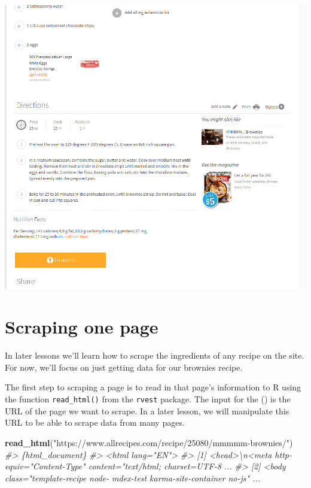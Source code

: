 \documentclass[
  12pt,
]{book}
\newenvironment{Shaded}{\begin{snugshade}}{\end{snugshade}}
\newcommand{\CommentTok}[1]{\textcolor[rgb]{0.37,0.37,0.37}{\textit{#1}}}
\newcommand{\KeywordTok}[1]{\textcolor[rgb]{0.27,0.27,0.27}{\textbf{#1}}}
\newcommand{\NormalTok}[1]{#1}
\newcommand{\StringTok}[1]{\textcolor[rgb]{0.5,0.5,0.5}{#1}}
\begin{document}
\includegraphics{images/brownies_2.PNG}

\hypertarget{scraping-one-page}{%
\section{Scraping one page}\label{scraping-one-page}}

In later lessons we'll learn how to scrape the ingredients of any recipe on the site. For now, we'll focus on just getting data for our brownies recipe.

The first step to scraping a page is to read in that page's information to R using the function \texttt{read\_html()} from the \texttt{rvest} package. The input for the () is the URL of the page we want to scrape. In a later lesson, we will manipulate this URL to be able to scrape data from many pages.

\begin{Shaded}
\begin{Highlighting}[]
\KeywordTok{read\_html}\NormalTok{(}\StringTok{"https://www.allrecipes.com/recipe/25080/mmmmm{-}brownies/"}\NormalTok{)}
\CommentTok{\#\textgreater{} \{html\_document\}}
\CommentTok{\#\textgreater{} \textless{}html lang="EN"\textgreater{}}
\CommentTok{\#\textgreater{} [1] \textless{}head\textgreater{}\textbackslash{}n\textless{}meta http{-}equiv="Content{-}Type" content="text/html; charset=UTF{-}8 ...}
\CommentTok{\#\textgreater{} [2] \textless{}body class="template{-}recipe node{-} mdex{-}test karma{-}site{-}container no{-}js"  ...}
\end{Highlighting}
\end{Shaded}
\end{document}
